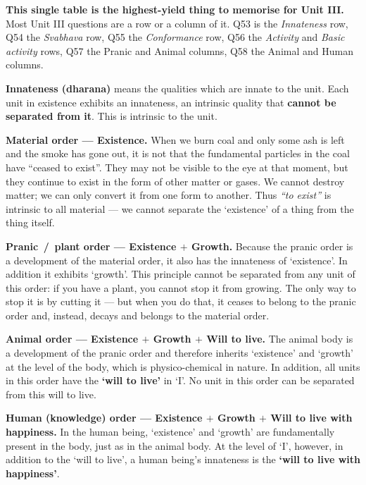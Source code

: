 \begin{note}
\textbf{\sffamily This single table is the highest-yield thing to memorise for
Unit III.} Most Unit III questions are a row or a column of it. Q53 is the
\emph{Innateness} row, Q54 the \emph{Svabhava} row, Q55 the
\emph{Conformance} row, Q56 the \emph{Activity} and \emph{Basic activity}
rows, Q57 the Pranic and Animal columns, Q58 the Animal and Human columns.
\end{note}


\ans \textbf{Innateness (dharana)} means the qualities which are innate to the
unit. Each unit in existence exhibits an innateness, an intrinsic quality that
\textbf{cannot be separated from it}. This is intrinsic to the unit.

\begin{abul}
\item \textbf{Material order --- Existence.} When we burn coal and only some
      ash is left and the smoke has gone out, it is not that the fundamental
      particles in the coal have ``ceased to exist''. They may not be visible
      to the eye at that moment, but they continue to exist in the form of
      other matter or gases. We cannot destroy matter; we can only convert it
      from one form to another. Thus \emph{``to exist''} is intrinsic to all
      material --- we cannot separate the `existence' of a thing from the
      thing itself.
\item \textbf{Pranic \,/\, plant order --- Existence $+$ Growth.} Because the
      pranic order is a development of the material order, it also has the
      innateness of `existence'. In addition it exhibits `growth'. This
      principle cannot be separated from any unit of this order: if you have a
      plant, you cannot stop it from growing. The only way to stop it is by
      cutting it --- but when you do that, it ceases to belong to the pranic
      order and, instead, decays and belongs to the material order.
\item \textbf{Animal order --- Existence $+$ Growth $+$ Will to live.} The
      animal body is a development of the pranic order and therefore inherits
      `existence' and `growth' at the level of the body, which is
      physico-chemical in nature. In addition, all units in this order have
      the \textbf{`will to live'} in `I'. No unit in this order can be
      separated from this will to live.
\item \textbf{Human (knowledge) order --- Existence $+$ Growth $+$ Will to
      live with happiness.} In the human being, `existence' and `growth' are
      fundamentally present in the body, just as in the animal body. At the
      level of `I', however, in addition to the `will to live', a human
      being's innateness is the \textbf{`will to live with happiness'}.
\end{abul}


